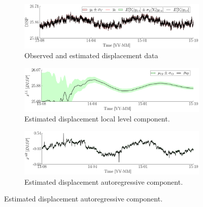 \begin{figure}[h!]
\centering
\begin{subfigure}{\linewidth}
\includegraphics[width=0.9\linewidth]{./docfigs/Example_DISPTEMPSIM/default/DISP_ObservedPredicted.pdf}
\caption{Observed and estimated displacement data} 
\end{subfigure}
\begin{subfigure}{\linewidth}
\includegraphics[width=0.9\linewidth]{./docfigs/Example_DISPTEMPSIM/default/DISP_LL_1.pdf}
\caption{Estimated displacement local level component.}
\end{subfigure}
\begin{subfigure}{\linewidth}
\includegraphics[width=0.9\linewidth]{./docfigs/Example_DISPTEMPSIM/default/DISP_AR_2.pdf}
\caption{Estimated displacement autoregressive component.}
\end{subfigure}
\end{figure}
